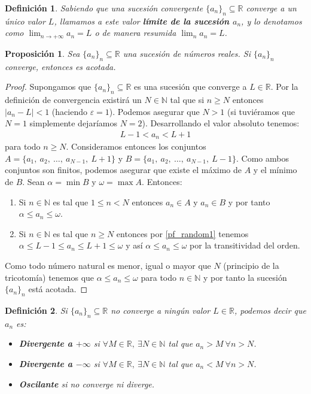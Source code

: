 \documentclass{article}
\newtheorem{prop}{Proposición}
\newtheorem{define}{Definición}
\newcommand{\reales}{\mathbb{R}}
\newcommand{\naturales}{\mathbb{N}}
\newcommand{\sucesion}[1]{\{ #1 _n \}_n}
\newcommand{\sucreal}[1]{\{ #1 _n \}_n \subseteq \reales}
\begin{document}
\begin{define}
	Sabiendo que una sucesión convergente $\{ a_n\}_n \subseteq \mathbb{R}$ converge a un único valor $L$, llamamos a este valor \textbf{límite de la sucesión $a_n$}, y lo denotamos como
	$\lim_{n\rightarrow +\infty} a_n = L$ o de manera resumida $\lim_{n} a_n = L$.
\end{define}

\begin{prop}
	Sea $\{ a_n\}_n \subseteq \mathbb{R}$ una sucesión de números reales. Si $\{ a_n\}_n$ converge, entonces es acotada.
\end{prop}

\begin{proof}
	Supongamos que $\sucreal{a}$ es una sucesión que converge a $L \in \reales$. Por la definición de convergencia existirá un $N \in \naturales$ tal que si $n \geq N$ entonces $|a_n - L| < 1$ (haciendo $\varepsilon = 1$). Podemos asegurar que $N > 1$ (si tuviéramos que $N = 1$ simplemente dejaríamos $N = 2$). Desarrollando el valor absoluto tenemos:
	\begin{align}\label{pf_random1}
		L - 1 < a_n < L + 1
	\end{align}	
	para todo $n \geq N$. Consideramos entonces los conjuntos $A = \{ a_1,\ a_2,\ \ldots,\ a_{N-1},\  L+1\}$ y $B = \{ a_1,\ a_2,\ \ldots,\ a_{N-1},\ L-1\}$. Como ambos conjuntos son finitos, podemos asegurar que existe el máximo de $A$ y el mínimo de $B$. Sean $\alpha = \min B$ y $\omega = \max A$. Entonces:
	\begin{enumerate}
	\item
	Si $n \in \naturales$ es tal que $1 \leq n < N$ entonces $a_n \in A$ y $a_n \in B$ y por tanto $\alpha \leq a_n \leq \omega$.
	\item
	Si $n \in \naturales$ es tal que $n \geq N$ entonces por \eqref{pf_random1} tenemos $\alpha \leq L - 1 \leq a_n \leq L + 1 \leq \omega$ y así $\alpha \leq a_n \leq \omega$ por la transitividad del orden.
	\end{enumerate}	 
	Como todo número natural es menor, igual o mayor que $N$ (principio de la tricotomía) tenemos que $\alpha \leq a_n \leq \omega$ para todo $n \in \naturales$ y por tanto la sucesión $\sucesion{a}$ está acotada.
\end{proof}

\begin{define}
	Si $\{ a_n\}_n \subseteq \mathbb{R}$ no converge a ningún valor $L\in\mathbb{R}$, podemos decir que $a_n$ es:
	\begin{itemize}
		\item
		\textbf{Divergente a $+\infty$} si $\forall M \in \mathbb{R},\ \exists N \in \mathbb{N}$ tal que $a_n > M\ \forall n>N$.
		
		\item
		\textbf{Divergente a $-\infty$} si $\forall M \in \mathbb{R},\ \exists N \in \mathbb{N}$ tal que $a_n < M\ \forall n>N$.
		
		\item
		\textbf{Oscilante} si no converge ni diverge.
	\end{itemize}
\end{define}
\end{document}
